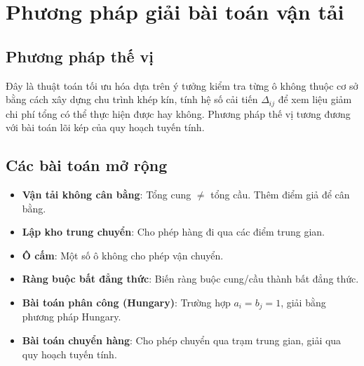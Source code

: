 \chapter{Phương pháp giải bài toán vận tải}
\section{Phương pháp thế vị}
Đây là thuật toán tối ưu hóa dựa trên ý tưởng kiểm tra từng ô không thuộc cơ sở bằng cách xây dựng chu trình khép kín, tính hệ số cải tiến $\Delta_{ij}$ để xem liệu giảm chi phí tổng có thể thực hiện được hay không. Phương pháp thế vị tương đương với bài toán lõi kép của quy hoạch tuyến tính.

\section{Các bài toán mở rộng}
\begin{itemize}
    \item \textbf{Vận tải không cân bằng}: Tổng cung $\neq$ tổng cầu. Thêm điểm giả để cân bằng.
    \item \textbf{Lập kho trung chuyển}: Cho phép hàng đi qua các điểm trung gian.
    \item \textbf{Ô cấm}: Một số ô không cho phép vận chuyển.
    \item \textbf{Ràng buộc bất đẳng thức}: Biến ràng buộc cung/cầu thành bất đẳng thức.
    \item \textbf{Bài toán phân công (Hungary)}: Trường hợp $a_i = b_j = 1$, giải bằng phương pháp Hungary.
    \item \textbf{Bài toán chuyển hàng}: Cho phép chuyển qua trạm trung gian, giải qua quy hoạch tuyến tính.
\end{itemize}
